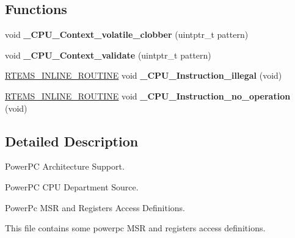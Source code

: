 \subsection*{Functions}
\begin{DoxyCompactItemize}
\item 
\mbox{\label{group__RTEMSScoreCPUPowerPC_gad26becade17fbdbb0bdf63c6b9228688}} 
void {\bfseries \+\_\+\+C\+P\+U\+\_\+\+Context\+\_\+volatile\+\_\+clobber} (uintptr\+\_\+t pattern)
\item 
\mbox{\label{group__RTEMSScoreCPUPowerPC_ga3adb94b8d32fd0e3058934ffd3df6d90}} 
void {\bfseries \+\_\+\+C\+P\+U\+\_\+\+Context\+\_\+validate} (uintptr\+\_\+t pattern)
\item 
\mbox{\label{group__RTEMSScoreCPUPowerPC_ga07618c93359f2485af2e98a96b330208}} 
\mbox{\hyperlink{group__RTEMSScoreBaseDefs_gac216239df231d5dbd15e3520b0b9313f}{R\+T\+E\+M\+S\+\_\+\+I\+N\+L\+I\+N\+E\+\_\+\+R\+O\+U\+T\+I\+NE}} void {\bfseries \+\_\+\+C\+P\+U\+\_\+\+Instruction\+\_\+illegal} (void)
\item 
\mbox{\label{group__RTEMSScoreCPUPowerPC_gab683a0a37a089e2a0fd3c356836d5499}} 
\mbox{\hyperlink{group__RTEMSScoreBaseDefs_gac216239df231d5dbd15e3520b0b9313f}{R\+T\+E\+M\+S\+\_\+\+I\+N\+L\+I\+N\+E\+\_\+\+R\+O\+U\+T\+I\+NE}} void {\bfseries \+\_\+\+C\+P\+U\+\_\+\+Instruction\+\_\+no\+\_\+operation} (void)
\end{DoxyCompactItemize}


\subsection{Detailed Description}
Power\+PC Architecture Support. 

Power\+PC C\+PU Department Source.

Power\+Pc M\+SR and Registers Access Definitions.

This file contains some powerpc M\+SR and registers access definitions. 